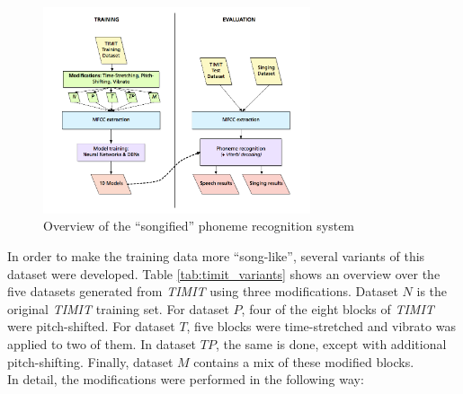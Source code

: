 \setlength{\belowcaptionskip}{-0.4cm}
\begin{figure}
 \begin{center}
                \includegraphics[width=0.7\textwidth]{images/process_songify.png}
                \caption{Overview of the ``songified'' phoneme recognition system}
                \label{fig:process_songify}
                 \end{center}
 \end{figure}
 \setlength{\belowcaptionskip}{-0.1cm}
In order to make the training data more ``song-like'', several variants of this dataset were developed. Table \ref{tab:timit_variants} shows an overview over the five datasets generated from \textit{TIMIT} using three modifications. Dataset $N$ is the original \textit{TIMIT} training set. For dataset $P$, four of the eight blocks of \textit{TIMIT} were pitch-shifted. For dataset $T$, five blocks were time-stretched and vibrato was applied to two of them. In dataset $TP$, the same is done, except with additional pitch-shifting. Finally, dataset $M$ contains a mix of these modified blocks.\\
In detail, the modifications were performed in the following way:

